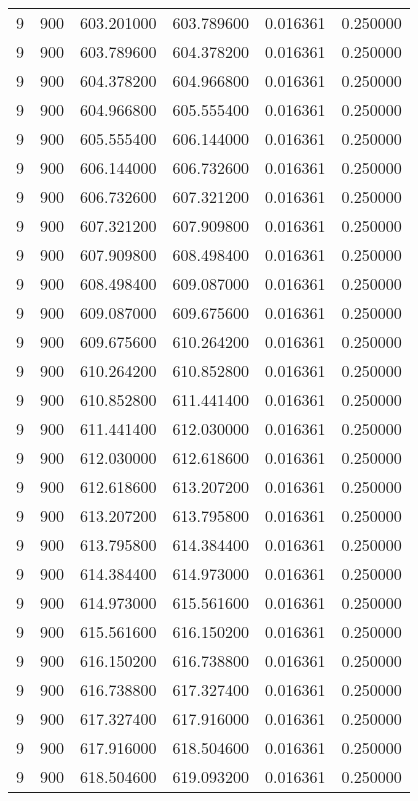 \begin{longtable}{rrrrrr}
9 & 900 & 603.201000 & 603.789600 & 0.016361 & 0.250000 \\
9 & 900 & 603.789600 & 604.378200 & 0.016361 & 0.250000 \\
9 & 900 & 604.378200 & 604.966800 & 0.016361 & 0.250000 \\
9 & 900 & 604.966800 & 605.555400 & 0.016361 & 0.250000 \\
9 & 900 & 605.555400 & 606.144000 & 0.016361 & 0.250000 \\
9 & 900 & 606.144000 & 606.732600 & 0.016361 & 0.250000 \\
9 & 900 & 606.732600 & 607.321200 & 0.016361 & 0.250000 \\
9 & 900 & 607.321200 & 607.909800 & 0.016361 & 0.250000 \\
9 & 900 & 607.909800 & 608.498400 & 0.016361 & 0.250000 \\
9 & 900 & 608.498400 & 609.087000 & 0.016361 & 0.250000 \\
9 & 900 & 609.087000 & 609.675600 & 0.016361 & 0.250000 \\
9 & 900 & 609.675600 & 610.264200 & 0.016361 & 0.250000 \\
9 & 900 & 610.264200 & 610.852800 & 0.016361 & 0.250000 \\
9 & 900 & 610.852800 & 611.441400 & 0.016361 & 0.250000 \\
9 & 900 & 611.441400 & 612.030000 & 0.016361 & 0.250000 \\
9 & 900 & 612.030000 & 612.618600 & 0.016361 & 0.250000 \\
9 & 900 & 612.618600 & 613.207200 & 0.016361 & 0.250000 \\
9 & 900 & 613.207200 & 613.795800 & 0.016361 & 0.250000 \\
9 & 900 & 613.795800 & 614.384400 & 0.016361 & 0.250000 \\
9 & 900 & 614.384400 & 614.973000 & 0.016361 & 0.250000 \\
9 & 900 & 614.973000 & 615.561600 & 0.016361 & 0.250000 \\
9 & 900 & 615.561600 & 616.150200 & 0.016361 & 0.250000 \\
9 & 900 & 616.150200 & 616.738800 & 0.016361 & 0.250000 \\
9 & 900 & 616.738800 & 617.327400 & 0.016361 & 0.250000 \\
9 & 900 & 617.327400 & 617.916000 & 0.016361 & 0.250000 \\
9 & 900 & 617.916000 & 618.504600 & 0.016361 & 0.250000 \\
9 & 900 & 618.504600 & 619.093200 & 0.016361 & 0.250000 \\

\end{longtable}
